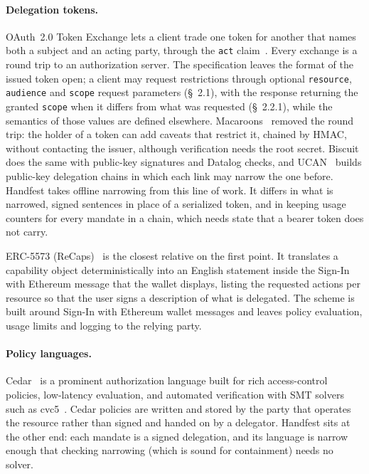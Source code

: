 \documentclass[10pt,twocolumn]{article}
\theoremstyle{plain}
\theoremstyle{definition}
\begin{document}
\paragraph{Delegation tokens.}
OAuth~2.0 Token Exchange lets a client trade one token for another that names both a subject and an acting party, through the \texttt{act} claim~\cite{rfc8693}. Every exchange is a round trip to an authorization server. The specification leaves the format of the issued token open; a client may request restrictions through optional \texttt{resource}, \texttt{audience} and \texttt{scope} request parameters (\S~2.1), with the response returning the granted \texttt{scope} when it differs from what was requested (\S~2.2.1), while the semantics of those values are defined elsewhere. Macaroons~\cite{birgisson2014macaroons} removed the round trip: the holder of a token can add caveats that restrict it, chained by HMAC, without contacting the issuer, although verification needs the root secret. Biscuit~\cite{biscuit} does the same with public-key signatures and Datalog checks, and UCAN~\cite{ucan} builds public-key delegation chains in which each link may narrow the one before. Handfest takes offline narrowing from this line of work. It differs in what is narrowed, signed sentences in place of a serialized token, and in keeping usage counters for every mandate in a chain, which needs state that a bearer token does not carry.

ERC-5573 (ReCaps)~\cite{erc5573} is the closest relative on the first point. It translates a capability object deterministically into an English statement inside the Sign-In with Ethereum message that the wallet displays, listing the requested actions per resource so that the user signs a description of what is delegated. The scheme is built around Sign-In with Ethereum wallet messages and leaves policy evaluation, usage limits and logging to the relying party.

\paragraph{Policy languages.}
Cedar~\cite{cutler2024cedar} is a prominent authorization language built for rich access-control policies, low-latency evaluation, and automated verification with SMT solvers such as cvc5~\cite{barbosa2022cvc5}. Cedar policies are written and stored by the party that operates the resource rather than signed and handed on by a delegator. Handfest sits at the other end: each mandate is a signed delegation, and its language is narrow enough that checking narrowing (which is sound for containment) needs no solver.
\end{document}
